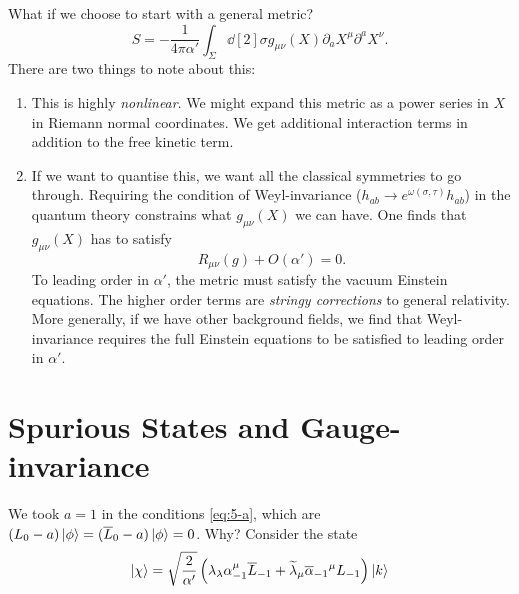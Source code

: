 What if we choose to start with a general metric?
\begin{equation}
  S = -\frac{1}{4 \pi \alpha'} \int_\Sigma \dd[2]{\sigma} g_{\mu\nu} (X) \partial_{a} X^{\mu} \partial^{a} X^{\nu}.
\end{equation}
There are two things to note about this:
\begin{enumerate}[1.]
  \item This is highly \emph{nonlinear}.
    We might expand this metric as a power series in $X$ in Riemann normal coordinates. We get additional interaction terms in addition to the free kinetic term.
  \item If we want to quantise this, we want all the classical symmetries to go through. Requiring the condition of Weyl-invariance ($h_{ab} \to e^{\omega(\sigma, \tau)} h_{ab}$) in the quantum theory constrains what $g_{\mu\nu}(X)$ we can have.
    One finds that $g_{\mu\nu}(X)$ has to satisfy
    \begin{equation}
      R_{\mu\nu}(g) + O(\alpha') = 0.
    \end{equation}
    To leading order in $\alpha'$, the metric must satisfy the vacuum Einstein equations. The higher order terms are \emph{stringy corrections} to general relativity.
    More generally, if we have other background fields, we find that Weyl-invariance requires the full Einstein equations to be satisfied to leading order in $\alpha'$.
\end{enumerate}

\section{Spurious States and Gauge-invariance}%
\label{sec:spurious_states_and_gauge_invariance}

We took $a = 1$ in the conditions \eqref{eq:5-a}, which are $(L_0 - a) \ket{\phi} = (\overline{L}_0 - a) \ket{\phi} = 0$.
Why?
Consider the state
\begin{equation}
  \ket{\chi} = \sqrt{\frac{2}{\alpha'}} \left( \lambda_{\lambda} \alpha^{\mu}_{-1} \overline{L}_{-1} + \widetilde{\lambda}_{\mu} \overline{\alpha}_{-1}{}^{\mu} L_{-1} \right) \ket{k}
\end{equation}

